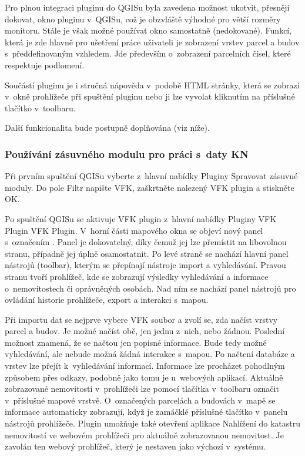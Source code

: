 \documentclass[a4paper,12pt]{article}
\begin{document}
Pro plnou integraci pluginu do QGISu byla zavedena možnost ukotvit, přesněji dokovat, okno pluginu v~QGISu, což je obzvláště výhodné pro větší rozměry monitoru.
Stále je však možné používat okno samostatně (nedokované).
Funkcí, která je zde hlavně pro ušetření práce uživateli je zobrazení vrstev parcel a budov s~předdefinovaným vzhledem.
Jde především o~zobrazení parcelních čísel, které respektuje podlomení.

Součástí pluginu je i stručná nápověda v~podobě HTML stránky, která se zobrazí v~okně prohlížeče při spuštění pluginu nebo ji lze vyvolat kliknutím na příslušné tlačítko v~toolbaru.

Další funkcionalita bude postupně doplňována (viz níže).


\subsubsection{Používání zásuvného modulu pro práci s~daty KN}
Při prvním spuštění QGISu vyberte z~hlavní nabídky Pluginy \textrightarrow{} Spravovat zásuvné moduly.
Do pole Filtr napište VFK, zaškrtněte nalezený VFK plugin a stiskněte OK.

Po spuštění QGISu se aktivuje VFK plugin z~hlavní nabídky Pluginy \textrightarrow{} VFK Plugin \textrightarrow{} VFK Plugin.
V~horní části mapového okna se objeví nový panel s~označením .
Panel je dokovatelný, díky čemuž jej lze přemístit na libovolnou stranu, případně jej úplně osamostatnit.
Po levé straně se nachází hlavní panel nástrojů (toolbar), kterým se přepínají nástroje import a vyhledávání.
Pravou stranu tvoří prohlížeč, kde se zobrazují výsledky vyhledávání a informace o~nemovitostech či oprávněných osobách.
Nad ním se nachází panel nástrojů pro ovládání historie prohlížeče, export a interakci s~mapou.

Při importu dat se nejprve vybere VFK soubor a zvolí se, zda načíst vrstvy parcel a budov.
Je možné načíst obě, jen jednu z~nich, nebo žádnou.
Poslední možnost znamená, že se načtou jen popisné informace.
Bude tedy možné vyhledávání, ale nebude možná žádná interakce s~mapou.
Po načtení databáze a vrstev lze přejít k~vyhledávání informací.
Informace lze procházet pohodlným způsobem přes odkazy, podobně jako tomu je u~webových aplikací.
Aktuálně zobrazované nemovitosti v~prohlížeči lze pomocí tlačítka v~toolbaru označit v~příslušné mapové vrstvě.
O~označených parcelách a budovách v~mapě se informace automaticky zobrazují, když je zamáčklé příslušné tlačítko v~panelu nástrojů prohlížeče.
Plugin umožňuje také otevření aplikace Nahlížení do katastru nemovitostí ve webovém prohlížeči pro aktuálně zobrazovanou nemovitost.
Je zavolán ten webový prohlížeč, který je nestaven jako výchozí v~systému.
\end{document}

